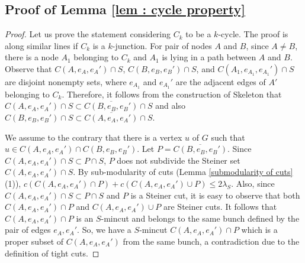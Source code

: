\documentclass[letterpaper,11pt]{article}
\begin{document}
\subsection{Proof of Lemma \ref{lem : cycle property}} \label{app : proof of cycle property}
\begin{proof}
    Let us prove the statement considering $C_k$ to be a $k$-cycle. The proof is along similar lines if $C_k$ is a $k$-junction. For pair of nodes $A$ and $B$, since $A\ne B$, there is a node $A_1$ belonging to $C_k$ and $A_1$ is lying in a path between $A$ and $B$. Observe that $C(A,e_A,e_A')\cap S$, $C(B,e_B,e_B')\cap S$, and $C(A_1,e_{A_1},e_{A_1}')\cap S$ are disjoint nonempty sets, where $e_{A_1}$ and $e_{A_1}'$ are the adjacent edges of $A'$ belonging to $C_k$. Therefore, it follows from the construction of Skeleton that $C(A,e_A,e_A')\cap S \subset \overline{C(B,e_B,e_B')} \cap S$ and also $C(B,e_B,e_B')\cap S  \subset \overline{C(A,e_A,e_A')}\cap S$.

    We assume to the contrary that there is a vertex $u$ of $G$ such that $u\in C(A,e_A,e_A')\cap C(B,e_B,e_B')$. Let $P=\overline{C(B,e_B,e_B')}$. Since $C(A,e_A,e_A')\cap S\subset P\cap S$, $P$ does not subdivide the Steiner set $C(A,e_A,e_A')\cap S$. By sub-modularity of cuts (Lemma \ref{submodularity of cuts}(1)), $c(C(A,e_A,e_A')\cap P)+c(C(A,e_A,e_A')\cup P)\le 2\lambda_S$. Also, since $C(A,e_A,e_A')\cap S\subset P\cap S$ and $P$ is a Steiner cut, it is easy to observe that both $C(A,e_A,e_A')\cap P$ and $C(A,e_A,e_A')\cup P$ are Steiner cuts. It follows that $C(A,e_A,e_A')\cap P$ is an $S$-mincut and belongs to the same bunch defined by the pair of edges $e_A,e_A'$. So, we have a $S$-mincut $C(A,e_A,e_A')\cap P$ which is a proper subset of $C(A,e_A,e_A')$ from the same bunch, a contradiction due to the definition of tight cuts.
\end{proof}
\end{document}

